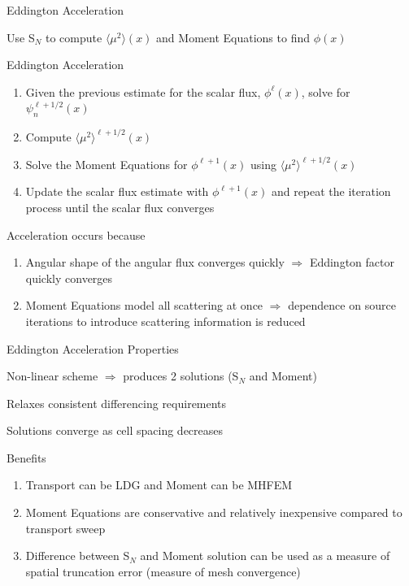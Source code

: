 \documentclass[10pt]{beamer}
\newcommand{\SN}{S$_N$\xspace}
\newcommand{\edd}{\langle \mu^2 \rangle}
\begin{document}
\begin{frame}{Eddington Acceleration}

    Use \SN to compute $\edd(x)$ and Moment Equations to find $\phi(x)$ 

    \begin{exampleblock}{Eddington Acceleration}
    \begin{enumerate}
        \item Given the previous estimate for the scalar flux, $\phi^{\ell}(x)$, solve for $\psi_n^{\ell+1/2}(x)$

        \item \alert{Compute $\edd^{\ell+1/2}(x)$ }

        \item \alert{Solve the Moment Equations for $\phi^{\ell+1}(x)$ 
        	using $\edd^{\ell+1/2}(x)$} 

        \item Update the scalar flux estimate with $\phi^{\ell+1}(x)$ and repeat the iteration process until the scalar flux converges
    \end{enumerate}
    \end{exampleblock}

    Acceleration occurs because
    \begin{enumerate}
    	\item Angular shape of the angular flux converges quickly $\Rightarrow$ Eddington factor quickly converges 

    	\item Moment Equations model all scattering at once $\Rightarrow$ dependence on source iterations to introduce scattering information is reduced 

    \end{enumerate}

\end{frame}

\begin{frame}{Eddington Acceleration Properties}

    Non-linear scheme $\Rightarrow$ produces 2 solutions (\SN and Moment)

    \pause
    Relaxes consistent differencing requirements 

    \pause
    Solutions converge as cell spacing decreases 

    \pause
    Benefits 
    \begin{enumerate}

    	\item Transport can be LDG and Moment can be MHFEM

        \item Moment Equations are conservative and relatively inexpensive compared to transport sweep 

        \item Difference between \SN and Moment solution can be used as a measure of spatial truncation error (measure of mesh convergence)

    \end{enumerate}

\end{frame}
\end{document}
